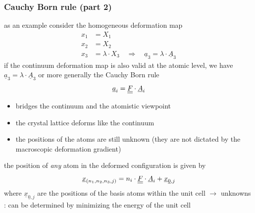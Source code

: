 \begin{frame}
  \frametitle{Cauchy Born rule (part 2)}
  
  as an example consider the homogeneous deformation map
  \begin{displaymath}
    \begin{alignedat}{1}
      x_1 &= X_1 \\
      x_2 &= X_2 \\
      x_3 &= \lambda \cdot X_3 \quad \Rightarrow \quad \underline{a}_3 = \lambda \cdot \underline{A}_3
    \end{alignedat}
  \end{displaymath}
  if the continuum deformation map is also valid at the atomic level, we have $\underline{a}_3 = \lambda \cdot \underline{A}_3$ \newline
  or more generally the Cauchy Born rule
  \begin{displaymath}
    \underline{a}_i = \underline{\underline{F}} \cdot \underline{A}_i
  \end{displaymath}
  \begin{itemize}
    \item bridges the continuum and the atomistic viewpoint
    \item the crystal lattice deforms like the continuum
    \item the positions of the atoms are still unknown \newline
      (they are not dictated by the macroscopic deformation gradient)
  \end{itemize}
  
  \vspace{0.7em}
  the position of \textit{any} atom in the deformed configuration is given by
  \begin{displaymath}
    \underline{x}_{(n_1,n_2,n_3,j)} =
    n_i \cdot \underline{\underline{F}} \cdot \underline{A}_i + \underline{x}_{\underline{0},j}
  \end{displaymath}
  where $\underline{x}_{\underline{0},j}$ are the positions of the basis atoms within the unit cell \newline %
  $\rightarrow$ unknowns : can be determined by minimizing the energy of the unit cell
  
\end{frame}


